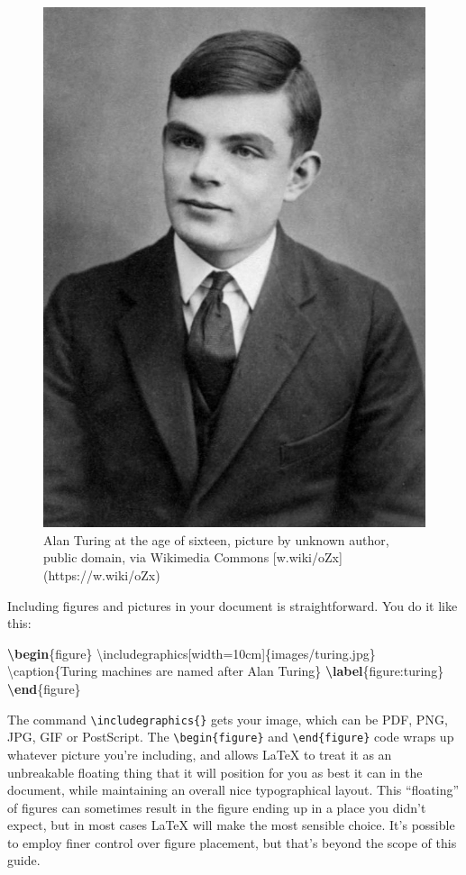 \documentclass[
]{book}
\newenvironment{Shaded}{\begin{snugshade}}{\end{snugshade}}
\newcommand{\BuiltInTok}[1]{#1}
\newcommand{\ExtensionTok}[1]{#1}
\newcommand{\FunctionTok}[1]{\textcolor[rgb]{0.00,0.00,0.00}{#1}}
\newcommand{\KeywordTok}[1]{\textcolor[rgb]{0.13,0.29,0.53}{\textbf{#1}}}
\newcommand{\NormalTok}[1]{#1}
\begin{document}
\begin{figure}

{\centering \includegraphics[width=0.4\linewidth]{images/Alan_Turing_Aged_16} 

}

\caption{Alan Turing at the age of sixteen, picture by unknown author, public domain, via Wikimedia Commons [w.wiki/oZx](https://w.wiki/oZx)}\label{fig:turing-fig}
\end{figure}

Including figures and pictures in your document is straightforward. You do it like this:

\begin{Shaded}
\begin{Highlighting}[]
\KeywordTok{\textbackslash{}begin}\NormalTok{\{}\ExtensionTok{figure}\NormalTok{\}}
\BuiltInTok{\textbackslash{}includegraphics}\NormalTok{[width=10cm]\{}\ExtensionTok{images/turing.jpg}\NormalTok{\}}
\FunctionTok{\textbackslash{}caption}\NormalTok{\{Turing machines are named after Alan Turing\}}
\KeywordTok{\textbackslash{}label}\NormalTok{\{}\ExtensionTok{figure:turing}\NormalTok{\}}
\KeywordTok{\textbackslash{}end}\NormalTok{\{}\ExtensionTok{figure}\NormalTok{\}}
\end{Highlighting}
\end{Shaded}

The command \texttt{\textbackslash{}includegraphics\{\}} gets your image, which can be PDF, PNG, JPG, GIF or PostScript. The \texttt{\textbackslash{}begin\{figure\}} and \texttt{\textbackslash{}end\{figure\}} code wraps up whatever picture you're including, and allows LaTeX to treat it as an unbreakable floating thing that it will position for you as best it can in the document, while maintaining an overall nice typographical layout. This ``floating'' of figures can sometimes result in the figure ending up in a place you didn't expect, but in most cases LaTeX will make the most sensible choice. It's possible to employ finer control over figure placement, but that's beyond the scope of this guide.
\end{document}

